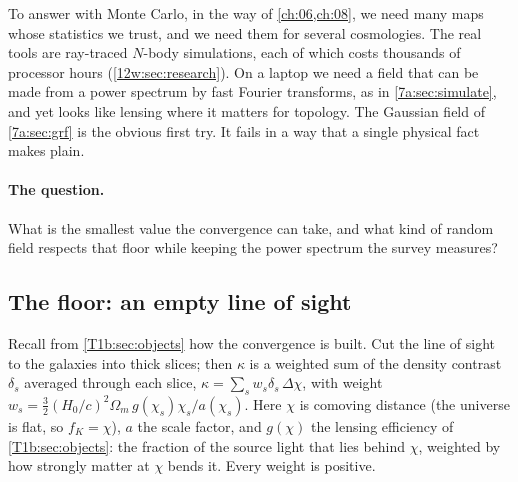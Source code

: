 To answer with Monte Carlo, in the way of \cref{ch:06,ch:08}, we need many maps whose statistics we trust, and
we need them for several cosmologies. The real tools are ray-traced $N$-body simulations, each of which costs
thousands of processor hours (\cref{12w:sec:research}). On a laptop we need a field that can be made from a power
spectrum by fast Fourier transforms, as in \cref{7a:sec:simulate}, and yet looks like lensing where it matters
for topology. The Gaussian field of \cref{7a:sec:grf} is the obvious first try. It fails in a way that a single
physical fact makes plain.

\paragraph{The question.} What is the smallest value the convergence can take, and what kind of random field
respects that floor while keeping the power spectrum the survey measures?

\subsection{The floor: an empty line of sight}
\label{12w:sec:floor}

Recall from \cref{T1b:sec:objects} how the convergence is built. Cut the line of sight to the galaxies into thick
slices; then $\kappa$ is a weighted sum of the density contrast $\delta_s$ averaged through each slice,
$\kappa=\sum_s w_s\delta_s\,\Delta\chi$, with weight
$w_s=\frac32(H_0/c)^2\Omega_m\,g(\chi_s)\chi_s/a(\chi_s)$. Here $\chi$ is comoving distance (the universe is flat,
so $f_K=\chi$), $a$ the scale factor, and $g(\chi)$ the lensing efficiency of \cref{T1b:sec:objects}: the fraction of
the source light that lies behind $\chi$, weighted by how strongly matter at $\chi$ bends it. Every weight is
positive.

